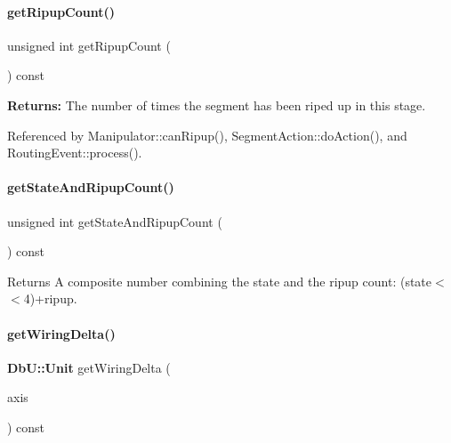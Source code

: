 \paragraph{\texorpdfstring{get\+Ripup\+Count()}{getRipupCount()}}
{\footnotesize\ttfamily unsigned int get\+Ripup\+Count (\begin{DoxyParamCaption}{ }\end{DoxyParamCaption}) const\hspace{0.3cm}{\ttfamily [inline]}}

{\bfseries Returns\+:} The number of times the segment has been riped up in this stage. 

Referenced by Manipulator\+::can\+Ripup(), Segment\+Action\+::do\+Action(), and Routing\+Event\+::process().

\mbox{\label{classKite_1_1DataNegociate_acdd169f3bd670279f0a891caa809f99a}} 
\paragraph{\texorpdfstring{get\+State\+And\+Ripup\+Count()}{getStateAndRipupCount()}}
{\footnotesize\ttfamily unsigned int get\+State\+And\+Ripup\+Count (\begin{DoxyParamCaption}{ }\end{DoxyParamCaption}) const\hspace{0.3cm}{\ttfamily [inline]}}

\begin{DoxyReturn}{Returns}
A composite number combining the state and the ripup count\+: {\ttfamily (state$<$$<$4)+ripup}. 
\end{DoxyReturn}
\mbox{\label{classKite_1_1DataNegociate_af920f8ca7404239772e56d00f779cac6}} 
\paragraph{\texorpdfstring{get\+Wiring\+Delta()}{getWiringDelta()}}
{\footnotesize\ttfamily \textbf{ Db\+U\+::\+Unit} get\+Wiring\+Delta (\begin{DoxyParamCaption}\item[{\textbf{ Db\+U\+::\+Unit}}]{axis }\end{DoxyParamCaption}) const}

